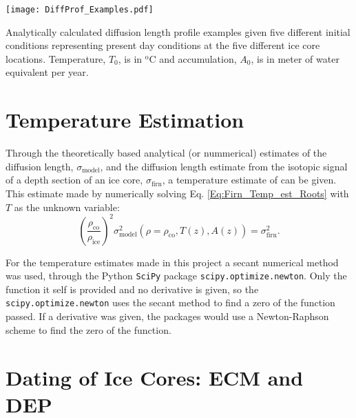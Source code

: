 \documentclass[../../CompleteThesis2/Complete_2ndDraft]{subfiles}
\begin{document}
\begin{marginfigure}
	\centering
	\texttt{[image: DiffProf\_Examples.pdf]}
	\caption[Five different analytical diffusion length profiles.]{\footnotesize Analytically calculated diffusion length profile examples given five different initial conditions representing present day conditions at the five different ice core locations. Temperature, $T_0$, is in $^{\text{o}}$C and accumulation, $A_0$, is in meter of water equivalent per year.}
	\label{Fig:DiffProf_Examples}
\end{marginfigure}

\section[Temperature Estimation]{Temperature Estimation}
\label{Sec:Ice_TempEstimation}

Through the theoretically based analytical (or nummerical) estimates of the diffusion length, $\sigma_{\text{model}}$, and the diffusion length estimate from the isotopic signal of a depth section of an ice core, $\sigma_{\text{firn}}$, a temperature estimate of can be given. This estimate made by numerically solving Eq. \ref{Eq:Firn_Temp_est_Roots} with $T$ as the unknown variable:
\begin{equation}
	\left(\frac{\rho_{\text{co}}}{\rho_{\text{ice}}}\right)^2 \sigma_{\text{model}}^2(\rho=\rho_{\text{co}}, T(z), A(z)) = \sigma^2_{\text{firn}}.
	\label{Eq:Firn_Temp_est_Roots2}
\end{equation}

For the temperature estimates made in this project a secant numerical method\cite{Press2007} was used, through the Python \lstinline[language=Python]|SciPy| package \lstinline[language=Python]|scipy.optimize.newton|. Only the function it self is provided and no derivative is given, so the \lstinline[language=Python]|scipy.optimize.newton| uses the secant method to find a zero of the function passed. If a derivative was given, the packages would use a Newton-Raphson\cite{Press2007} scheme to find the zero of the function.







\section[ECM and DEP][ECM and DEP]{Dating of Ice Cores: ECM and DEP}
\label{Sec:Ice_ECMandDEP}
\end{document}
